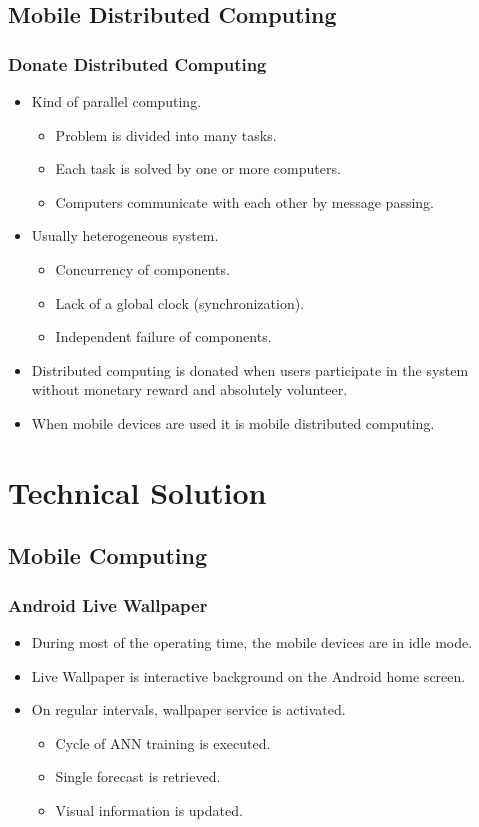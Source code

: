 \documentclass{beamer}
\begin{document}
\subsection{Mobile Distributed Computing}

\begin{frame}
\frametitle{Donate Distributed Computing}
\begin{itemize}
  \item Kind of parallel computing.
  \begin{itemize}
    \item Problem is divided into many tasks.
    \item Each task is solved by one or more computers.
    \item Computers communicate with each other by message passing.
  \end{itemize}
  \item Usually heterogeneous system.
  \begin{itemize}
    \item Concurrency of components.
    \item Lack of a global clock (synchronization).
    \item Independent failure of components.
  \end{itemize}
  \item Distributed computing is donated when users participate in the system without monetary reward and absolutely volunteer.
  \item When mobile devices are used it is mobile distributed computing.
\end{itemize}
\end{frame}

\section{Technical Solution}

\subsection{Mobile Computing}

\begin{frame}
\frametitle{Android Live Wallpaper}
\begin{itemize}
  \item During most of the operating time, the mobile devices are in idle mode.
  \item Live Wallpaper is interactive background on the Android home screen.
  \item On regular intervals, wallpaper service is activated.
  \begin{itemize}
    \item Cycle of ANN training is executed.
    \item Single forecast is retrieved.
    \item Visual information is updated.
  \end{itemize}
\end{itemize}
\end{frame}
\end{document}
